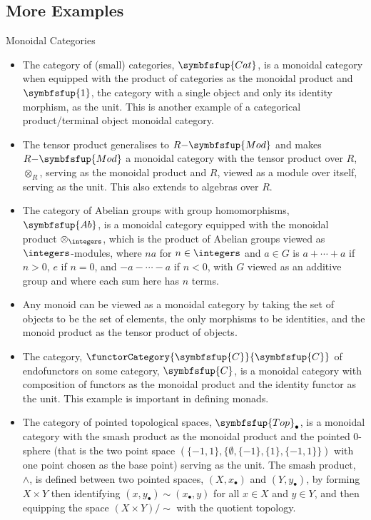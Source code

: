 \documentclass[fleqn]{NotesClass}
\makeatletter
\newcommand{\cat}[1]{\symbfsfup{#1}}
\newcommand{\c@egory}[1]{\symbfsfup{#1}}
\newcommand{\RMod}[1][R]{#1{-}\c@egory{Mod}}
\newcommand{\pointedTop}{\c@egory{Top}_{\bullet}}
\newcommand{\Cat}{\c@egory{Cat}}
\newcommand{\Ab}{\c@egory{Ab}}
\newcommand{\one}{\c@egory{1}}
\makeatother
\begin{document}
    \subsection{More Examples}
    \begin{exm}{Monoidal Categories}{}
        \begin{itemize}
            \item The category of (small) categories, \(\Cat\), is a monoidal category when equipped with the product of categories as the monoidal product and \(\one\), the category with a single object and only its identity morphism, as the unit.
            This is another example of a categorical product/terminal object monoidal category.
            \item The tensor product generalises to \(\RMod\) and makes \(\RMod\) a monoidal category with the tensor product over \(R\), \(\otimes_R\), serving as the monoidal product and \(R\), viewed as a module over itself, serving as the unit.
            This also extends to algebras over \(R\).
            \item The category of Abelian groups with group homomorphisms, \(\Ab\), is a monoidal category equipped with the monoidal product \(\otimes_{\integers}\), which is the product of Abelian groups viewed as \(\integers\)-modules, where \(na\) for \(n \in \integers\) and \(a \in G\) is \(a + \dotsb + a\) if \(n > 0\), \(e\) if \(n = 0\), and \(-a - \dotsb - a\) if \(n < 0\), with \(G\) viewed as an additive group and where each sum here has \(n\) terms.
            \item Any monoid can be viewed as a monoidal category by taking the set of objects to be the set of elements, the only morphisms to be identities, and the monoid product as the tensor product of objects.
            \item The category, \(\functorCategory{\cat{C}}{\cat{C}}\) of endofunctors on some category, \(\cat{C}\), is a monoidal category with composition of functors as the monoidal product and the identity functor as the unit.
            This example is important in defining monads.
            \item The category of pointed topological spaces, \(\pointedTop\), is a monoidal category with the smash product as the monoidal product and the pointed 0-sphere (that is the two point space \((\{-1, 1\}, \{\emptyset, \{-1\}, \{1\}, \{-1, 1\}\})\) with one point chosen as the base point) serving as the unit.
            The smash product, \(\wedge\), is defined between two pointed spaces, \((X, x_\bullet)\) and \((Y, y_\bullet)\), by forming \(X \times Y\) then identifying \((x, y_\bullet) \sim (x_\bullet, y)\) for all \(x \in X\) and \(y \in Y\), and then equipping the space \((X \times Y)/\sim\) with the quotient topology.

\end{itemize}
\end{exm}
\end{document}
